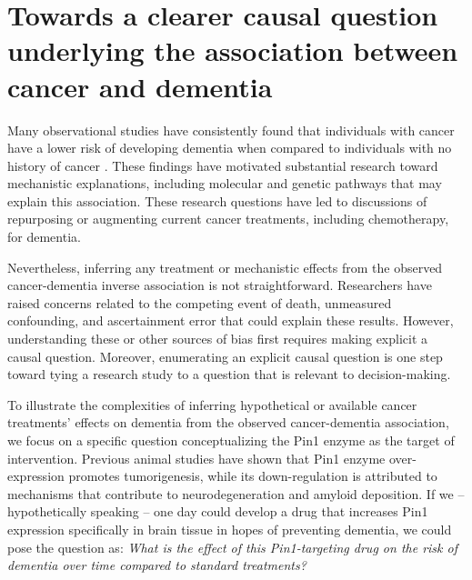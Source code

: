 \documentclass[
]{book}
\begin{document}
\hypertarget{towards-a-clearer-causal-question-underlying-the-association-between-cancer-and-dementia}{%
\section{Towards a clearer causal question underlying the association between cancer and dementia}\label{towards-a-clearer-causal-question-underlying-the-association-between-cancer-and-dementia}}

Many observational studies have consistently found that individuals with cancer have a lower risk of developing dementia when compared to individuals with no history of cancer \autocite{ma2014,hanson2016,vanderwillik2018,ospina2020}. These findings have motivated substantial research toward mechanistic explanations, including molecular and genetic pathways that may explain this association\autocite{behrens2009,harris2014,nudelman2019,Papin2020,driverbiogeront2014,olson2019,li2021,driverpin2015}. These research questions have led to discussions of repurposing or augmenting current cancer treatments, including chemotherapy, for dementia\autocite{snyder2017}.

Nevertheless, inferring any treatment or mechanistic effects from the observed cancer-dementia inverse association is not straightforward. Researchers have raised concerns related to the competing event of death, unmeasured confounding, and ascertainment error that could explain these results\autocite{driverbiogeront2014,ganguli2015}. However, understanding these or other sources of bias first requires making explicit a causal question. Moreover, enumerating an explicit causal question is one step toward tying a research study to a question that is relevant to decision-making\autocite{didelez2016,labrecque2017}.

To illustrate the complexities of inferring hypothetical or available cancer treatments' effects on dementia from the observed cancer-dementia association, we focus on a specific question conceptualizing the Pin1 enzyme as the target of intervention. Previous animal studies have shown that Pin1 enzyme over-expression promotes tumorigenesis, while its down-regulation is attributed to mechanisms that contribute to neurodegeneration and amyloid deposition\autocite{driverpin2015,angelucci2017,li2021}. If we -- hypothetically speaking -- one day could develop a drug that increases Pin1 expression specifically in brain tissue in hopes of preventing dementia, we could pose the question as: \emph{What is the effect of this Pin1-targeting drug on the risk of dementia over time compared to standard treatments?}
\end{document}
